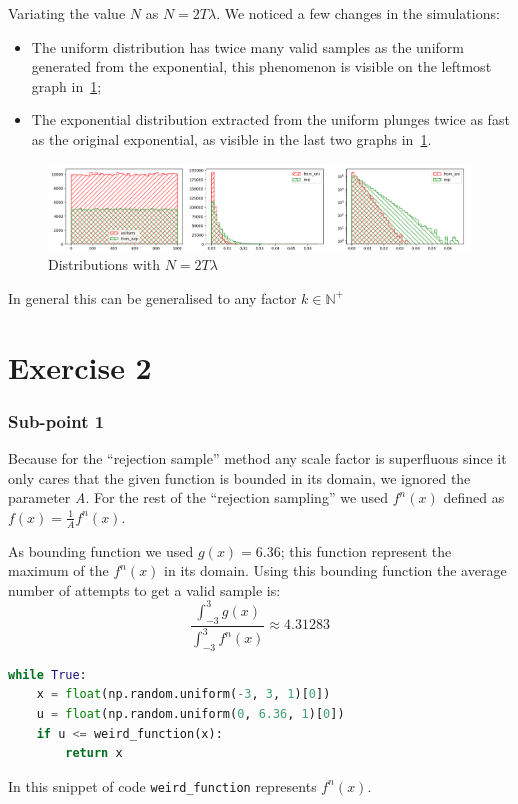 \documentclass[10pt,a4paper]{article}
\begin{document}
Variating the value \(N\) as \(N=2T\lambda\). We noticed a few changes in the simulations:
\begin{itemize}
\item The uniform distribution has twice many valid samples as the uniform generated from the exponential, this phenomenon is visible on the leftmost graph in~\ref{fig:3};
\item The exponential distribution extracted from the uniform plunges twice as fast as the original exponential, as visible in the last two graphs in~\ref{fig:3}.
\end{itemize}

\begin{figure}[h]
  \includegraphics[scale=0.4]{es1-3.png}
  \caption{Distributions with \(N=2T\lambda\)}
  \label{fig:3}
\end{figure}

In general this can be generalised to any factor \(k\in\mathbb{N}^{+}\)

\section*{Exercise 2}

\subsubsection*{Sub-point 1}

Because for the ``rejection sample'' method any scale factor is superfluous since it only cares that the given function is bounded in its domain, we ignored the parameter \emph{A}. For the rest of the ``rejection sampling'' we used \(f^{n}(x)\) defined as \(f(x) = \frac{1}{A}f^{n}(x)\).

As bounding function we used \(g(x) = 6.36\); this function represent the maximum of the \(f^{n}(x)\) in its domain. Using this bounding function the average number of attempts to get a valid sample is:
\begin{equation*}
  \frac{\int^{3}_{-3}{g(x)}}{\int^{3}_{-3}{f^{n}(x)}}\approx4.31283
\end{equation*}

\begin{lstlisting}[language=python]
while True:
    x = float(np.random.uniform(-3, 3, 1)[0])
    u = float(np.random.uniform(0, 6.36, 1)[0])
    if u <= weird_function(x):
        return x
\end{lstlisting}
In this snippet of code \texttt{weird\_function} represents \(f^{n}(x)\).%
\end{document}
